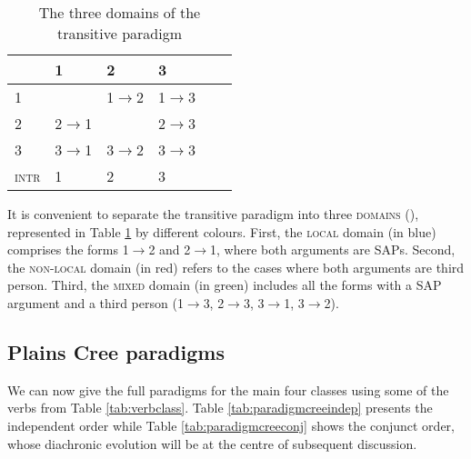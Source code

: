 \documentclass[twoside,a4paper,11pt]{article}
\newcommand{\grise}[1]{\cellcolor{lightgray}\textbf{#1}}
\newcommand{\Σ}{\greek{Σ}}
\begin{document}
\begin{table}[H] 
\caption{The three domains of the transitive paradigm} 
 \centering \label{tab:domain}
\begin{tabular}{l|lllll} 
\toprule
&1 & 2 &3\\
\hline
1 &\grise{} &1$\rightarrow$2\cellcolor[wave]{465} & 1$\rightarrow$3 \cellcolor[wave]{520} \\
2&2$\rightarrow$1\cellcolor[wave]{465}&\grise{}&2$\rightarrow$3 \cellcolor[wave]{520} \\
3&3$\rightarrow$1 \cellcolor[wave]{520}&3$\rightarrow$2 \cellcolor[wave]{520}&3$\rightarrow$3\cellcolor[wave]{650}\\
\hline
\textsc{intr}&1&2&3\\
\bottomrule
\end{tabular}
\end{table}
 
It is convenient to separate the transitive paradigm into three \textsc{domains} (\citealt[47-54]{zuniga06}), represented in Table  \ref{tab:domain} by different colours. First, the \textsc{local} domain (in blue) comprises the forms 1$\rightarrow$2 and 2$\rightarrow$1, where both arguments are SAPs. Second, the \textsc{non-local} domain (in red) refers to the cases where both arguments are third person. Third, the \textsc{mixed} domain (in green) includes all the forms with a SAP argument and a third person (1$\rightarrow$3, 2$\rightarrow$3, 3$\rightarrow$1, 3$\rightarrow$2). 


\subsection{Plains Cree paradigms}
\label{subsec:creeparadigm}
We can now give the full paradigms for the main four classes using some of the verbs from Table \ref{tab:verbclass}. Table \ref{tab:paradigmcreeindep} presents the independent order while Table \ref{tab:paradigmcreeconj} shows the conjunct order, whose diachronic evolution will be at the centre of subsequent discussion.

\end{document}
